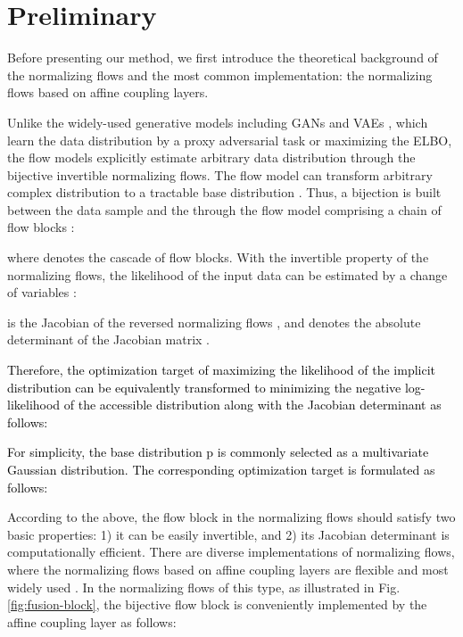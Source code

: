 \documentclass[lettersize,journal]{IEEEtran}
\newcommand{\rounda}[1]{\textcolor{black}{#1}}
\begin{document}
\section{Preliminary} \label{sec:theory-background}
Before presenting our method, we first introduce the theoretical background of the normalizing flows and the most common implementation: the normalizing flows based on affine coupling layers.

Unlike the widely-used generative models including GANs \cite{goodfellow2014generative, esser2021taming} and VAEs \cite{kingma2013vaes, razavi2019generating}, which learn the data distribution by a proxy adversarial task or maximizing the ELBO, the flow models explicitly estimate arbitrary data distribution through the bijective invertible normalizing flows. 
The flow model  can transform arbitrary complex distribution  to a tractable base distribution .
Thus, a bijection is built between the data sample  and the  through the flow model  comprising a chain of  flow blocks :

where  denotes the cascade of flow blocks.
With the invertible property of the normalizing flows, the likelihood of the input data  can be estimated by a change of variables \cite{halmos2013measure}:

 is the Jacobian of the reversed normalizing flows , and  denotes the absolute determinant of the Jacobian matrix .
\rounda{Therefore, the optimization target of maximizing the likelihood of the implicit distribution  can be equivalently transformed to minimizing the negative log-likelihood  of the accessible distribution  along with the Jacobian determinant as follows:

For simplicity, the base distribution p is commonly selected as a multivariate Gaussian distribution. The corresponding optimization target is formulated as follows:

}

According to the above, the flow block  in the normalizing flows  should satisfy two basic properties: 1) it can be easily invertible, and 2) its Jacobian determinant is computationally efficient.
There are diverse implementations \cite{germain2015made, van2016pixel, van2016wavenet, papamakarios2017masked, kingma2016improved} of normalizing flows, where the normalizing flows based on affine coupling layers are flexible and most widely used \cite{dinh2014nice, dinh2016realnvp,kingma2018glow,kirichenko2020normalizing}. In the normalizing flows of this type, as illustrated in Fig. \ref{fig:fusion-block}, the bijective flow block  is conveniently implemented by the affine coupling layer as follows:
\end{document}
